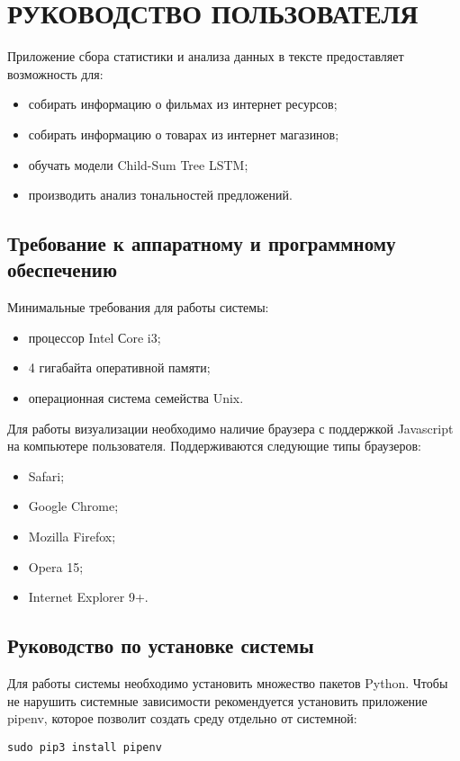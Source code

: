 \section{РУКОВОДСТВО ПОЛЬЗОВАТЕЛЯ}
Приложение сбора статистики и анализа данных в тексте предоставляет возможность для:
\begin{itemize}
\item собирать информацию о фильмах из интернет ресурсов;
\item собирать информацию о товарах из интернет магазинов;
\item обучать модели Child-Sum Tree LSTM\@;
\item производить анализ тональностей предложений.
\end{itemize}

\subsection{Требование к аппаратному и программному обеспечению}
Минимальные требования для работы системы:
\begin{itemize}
\item процессор Intel Сore i3;
\item 4 гигабайта оперативной памяти;
\item операционная система семейства Unix.
\end{itemize}

Для работы визуализации необходимо наличие браузера с поддержкой Javascript на компьютере пользователя. Поддерживаются следующие типы браузеров:
\begin{itemize}
\item Safari;
\item Google Chrome;
\item Mozilla Firefox;
\item Opera 15;
\item Internet Explorer 9+.
\end{itemize}

\subsection{Руководство по установке системы}
Для работы системы необходимо установить множество пакетов Python. Чтобы не нарушить системные зависимости рекомендуется установить приложение pipenv, которое позволит создать среду отдельно от системной:
\medskip
\begin{lstlisting}[style=Python]
  sudo pip3 install pipenv
\end{lstlisting}
\medskip

